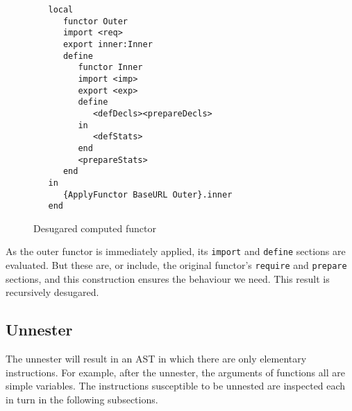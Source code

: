 \documentclass[a4paper]{memoir}
\begin{document}
\begin{figure}[ht]
\begin{lstlisting}
   local
      functor Outer
      import <req>
      export inner:Inner
      define
         functor Inner
         import <imp>
         export <exp>
         define
            <defDecls><prepareDecls>
         in
            <defStats>
         end
         <prepareStats>
      end
   in
      {ApplyFunctor BaseURL Outer}.inner
   end
\end{lstlisting}
\caption{Desugared computed functor}
\label{fig:desugar:desugared_computed_functor_example}
\end{figure}

As the outer functor is immediately applied, its \lstinline!import! and \lstinline!define! sections are evaluated.
But these are, or include, the original functor's \lstinline!require! and \lstinline!prepare! sections, and this
construction ensures the behaviour we need.
This result is recursively desugared.

\subsection{Unnester}\label{sec:arch:unnester}
The unnester will result in an AST in which there are only elementary instructions. For example, after the unnester, the arguments of functions all are simple variables. The instructions susceptible to be unnested are inspected each in turn in the following subsections.
\end{document}
